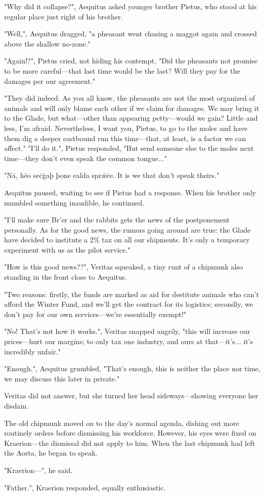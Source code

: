 "Why did it collapse?", Aequitus asked younger brother Pietus, who stood at his regular place just right of his brother.

"Well,", Aequitus dragged, "a pheasant went chasing a maggot again and crossed above the shallow no-zone."

"Again!?", Pietus cried, not hiding his contempt, "Did the pheasants not promise to be more careful---that last time would be the last? Will they pay for the damages per our agreement."

"They did indeed. As you all know, the pheasants are not the most organized of animals and will only blame each other if we claim for damages. We may bring it to the Glade, but what---other than appearing petty---would we gain? Little and less, I'm afraid. Nevertheless, I want you, Pietus, to go to the moles and have them dig a deeper eastbound run this time---that, at least, is a factor we can affect."
"I'll do it.", Pietus responded, "But send someone else to the moles next time---they don't even speak the common tongue..."

"Nā, hēo seċġaþ þone ealda sprǣċe. It is we that don't speak theirs."

Aequitus paused, waiting to see if Pietus had a response. When his brother only mumbled something inaudible, he continued.

"I'll make sure Br'er and the rabbits gets the news of the postponement personally. As for the good news, the rumors going around are true: the Glade have decided to institute a 2\% tax on all our shipments. It's only a temporary experiment with us as the pilot service."

"How is this good news??", Veritas squeaked, a tiny runt of a chipmunk also standing in the front close to Aequitus.

"Two reasons: firstly, the funds are marked as aid for destitute animals who can't afford the Winter Fund, and we'll get the contract for its logistics; secondly, we don't pay for our own services---we're essentially exempt!"

"No! That's not how it works.", Veritas snapped angrily, "this will increase our prices---hurt our margins; to only tax one industry, and ours at that---it's... it's incredibly unfair."

"Enough.", Aequitus grumbled, "That's enough, this is neither the place nor time, we may discuss this later in private."

Veritas did not answer, but she turned her head sideways---showing everyone her disdain.

The old chipmunk moved on to the day's normal agenda, dishing out more routinely orders before dismissing his workforce. However, his eyes were fixed on Kraerion---the dismissal did not apply to him. When the last chipmunk had left the Aorta, he began to speak.

"Kraerion---", he said.

"Father.", Kraerion responded, equally enthusiastic.


